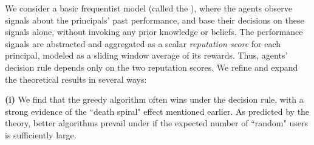

We consider a basic frequentist model (called the \emph{\ExptsModel}), where the agents observe signals about the principals' past performance, and base their decisions on these signals alone, without invoking any prior knowledge or beliefs. The performance signals are abstracted and aggregated as a scalar \emph{reputation score} for each principal, modeled as a sliding window average of its rewards. Thus, agents' decision rule depends only on the two reputation scores.
We refine and expand the theoretical results in several ways:

\textbf{(i)}
We find that the greedy algorithm often wins under the \HardMax decision rule, with a strong evidence of the ``death spiral" effect mentioned earlier.
 As predicted by the theory, better algorithms prevail under \HardMaxRandom if the expected number of ``random" users is sufficiently large. 

